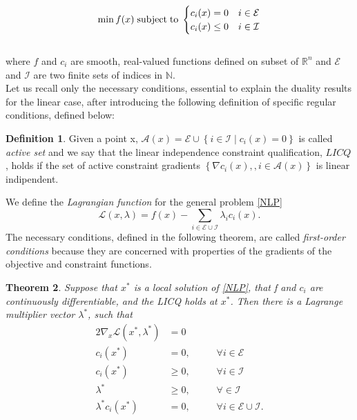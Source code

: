 \documentclass[a4paper,10 pt,titlepage,twoside]{book}
\theoremstyle{plain}
\newtheorem{thm}{Theorem}[chapter]
\theoremstyle{definition}
\newtheorem{defn}[thm]{Definition}
\theoremstyle{remark}
\begin{document}
\begin{equation}\label{NLP}
\min f(x)\text{\;subject\;to\;}\begin{cases} c_{i}(x) = 0 &i \in \mathcal{E}\\ c_{i}(x)\leq 0 &i\in \mathcal{I}\end{cases}
\end{equation}
\\
where $f$ and $c_{i}$ are smooth, real-valued functions defined on subset of $\mathbb{R}^{n}$ and $\mathcal{E}$ and $\mathcal{I}$ are two finite sets of indices in $\mathbb{N}$.\\Let us recall only the necessary conditions, essential to explain the duality results for the linear case, after introducing the following definition of specific regular conditions, defined below:
\begin{defn}
	Given a point x, $\mathcal{A}(x)= \mathcal{E}\cup\left\lbrace i\in\mathcal{I}\;|\;c_{i}(x) =0\right\rbrace$ is called \textit{active set} and we say that the linear independence constraint qualification, $LICQ$, holds if the set of active constraint gradients $\left\lbrace \nabla c_{i}(x),,i\in\mathcal{A}(x)\right\rbrace$ is linear indipendent.
\end{defn}
We define the \textit{Lagrangian function} for the general problem \ref{NLP} 
\begin{equation*}
\mathcal{L}\left(x,\lambda\right)=f(x)-\sum_{i\in\mathcal{E}\cup\mathcal{I}}\lambda_{i}c_{i}(x).
\end{equation*}
The necessary conditions, defined in the following theorem, are called \textit{first-order conditions} because they are concerned with properties of the gradients of the objective and constraint functions.
\begin{thm}
Suppose that $x^{*}$ is a local solution of \ref{NLP}, that f and $c_{i}$ are continuously differentiable, and the LICQ holds at $x^{*}$. Then there is a Lagrange multiplier vector $\lambda^{*}$, such that 
\begin{alignat*}{2}
\nabla_{x}\mathcal{L}(x^{*},\lambda^{*})&=0&&\\
c_{i}(x^{*})&=0, &&\;\;\;\;\forall i\in\mathcal{E}\\
c_{i}(x^{*})&\geq 0, &&\;\;\;\;\forall i\in\mathcal{I}\\
\lambda^{*} &\geq 0, &&\;\;\;\;\forall \in\mathcal{I}\\
\lambda^{*}c_{i}(x^{*})&= 0,&&\;\;\;\;\forall i\in\mathcal{E}\cup\mathcal{I}.\label{CompCon}\\
\end{alignat*} 
\end{thm}
\end{document}

